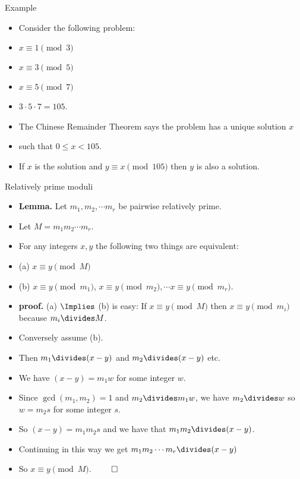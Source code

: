 \documentclass[handout]{beamer}
\begin{document}
\begin{frame}{Example}

\begin{itemize}
  \item Consider the following problem:
  \item $x \equiv 1 \pmod 3$
  \item $x \equiv 3 \pmod 5$
  \item $x \equiv 5 \pmod 7$
  \item $3\cdot 5 \cdot 7 = 105$.
  \item The Chinese Remainder Theorem says the problem has a unique solution $x$
  \item such that $0\leq x < 105$.
  \item If $x$ is the solution and $y\equiv x \pmod {105}$ then $y$ is also a solution.
\end{itemize}

\end{frame}


\begin{frame}{Relatively prime moduli}

\begin{itemize}
  \item \textbf{Lemma.} Let $m_1, m_2, \cdots m_r$  be pairwise relatively prime.
  \item Let $M=m_1 m_2 \cdots m_r$.
  \item For any integers $x,y$ the following two things are equivalent:
  \item (a) $x \equiv y \pmod M$
  \item (b) $x \equiv y \pmod {m_1}$, $x\equiv y\pmod {m_2}, \cdots x\equiv y \pmod {m_r}$.
  \item \textbf{proof.} (a) $\Implies$ (b) is easy:
  If $x \equiv y \pmod M$ then $x\equiv y \pmod {m_i}$ because $m_i\divides M$.
  \item Conversely assume (b).
  \item Then $m_1 \divides (x-y)$ and $m_2 \divides (x-y)$ etc.
  \item We have $(x-y) = m_1 w$ for some integer $w$.
  \item Since $\gcd(m_1,m_2) = 1$ and $m_2\divides m_1 w$, we have $m_2 \divides w$
  so $w=m_2s$ for some integer $s$.
  \item So $(x-y) = m_1 m_2 s$ and we have that $m_1 m_2 \divides (x-y)$.
  \item Continuing in this way we get $m_1 m_2 \cdots m_r \divides (x-y)$
  \item So $x\equiv y \pmod M$. $\qed$
\end{itemize}

\end{frame}
\end{document}

